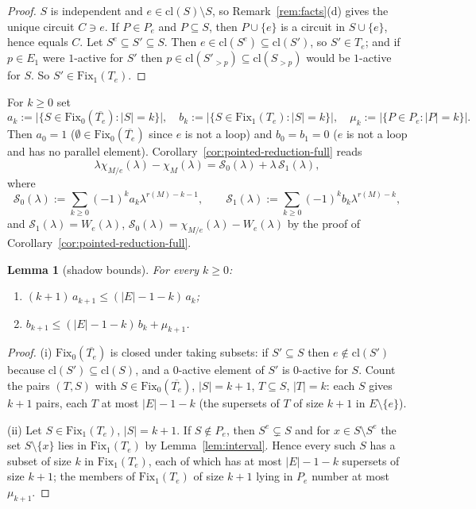 \documentclass[11pt,a4paper]{article}
\newtheorem{lemma}[theorem]{Lemma}
\theoremstyle{definition}
\newcommand{\Fix}{\mathrm{Fix}}
\newcommand{\cl}{\mathrm{cl}}
\begin{document}
\begin{proof}
$S$ is independent and $e\in\cl(S)\setminus S$, so Remark~\ref{rem:facts}(d) gives the unique circuit $C\ni e$. If $P\in P_e$ and $P\subseteq S$, then $P\cup\{e\}$ is a circuit in $S\cup\{e\}$, hence equals $C$. Let $S^e\subseteq S'\subseteq S$. Then $e\in\cl(S^e)\subseteq\cl(S')$, so $S'\in T_e$; and if $p\in E_1$ were $1$-active for $S'$ then $p\in\cl(S'_{>p})\subseteq\cl(S_{>p})$ would be $1$-active for $S$. So $S'\in\Fix_1(T_e)$.
\end{proof}

For $k\ge0$ set
\[
a_k:=\bigl|\{S\in\Fix_0(\overline{T_e}):|S|=k\}\bigr|,\quad
b_k:=\bigl|\{S\in\Fix_1(T_e):|S|=k\}\bigr|,\quad
\mu_k:=\bigl|\{P\in P_e:|P|=k\}\bigr| .
\]
Then $a_0=1$ ($\emptyset\in\Fix_0(\overline{T_e})$ since $e$ is not a loop) and $b_0=b_1=0$ ($e$ is not a loop and has no parallel element). Corollary~\ref{cor:pointed-reduction-full} reads
\begin{equation}\label{eq:ab}
\lambda\chi_{M/e}(\lambda)-\chi_M(\lambda)=\mathcal S_0(\lambda)+\lambda\,\mathcal S_1(\lambda),
\end{equation}
where
\[
\mathcal S_0(\lambda):=\sum_{k\ge0}(-1)^ka_k\lambda^{r(M)-k-1},\qquad
\mathcal S_1(\lambda):=\sum_{k\ge0}(-1)^kb_k\lambda^{r(M)-k},
\]
and $\mathcal S_1(\lambda)=W_e(\lambda)$, $\mathcal S_0(\lambda)=\chi_{M/e}(\lambda)-W_e(\lambda)$ by the proof of Corollary~\ref{cor:pointed-reduction-full}.

\begin{lemma}[shadow bounds]\label{lem:shadow}
For every $k\ge0$:
\begin{enumerate}[label=\textnormal{(\roman*)}]
\item $(k+1)\,a_{k+1}\le(|E|-1-k)\,a_k$;
\item $b_{k+1}\le(|E|-1-k)\,b_k+\mu_{k+1}$.
\end{enumerate}
\end{lemma}

\begin{proof}
(i) $\Fix_0(\overline{T_e})$ is closed under taking subsets: if $S'\subseteq S$ then $e\notin\cl(S')$ because $\cl(S')\subseteq\cl(S)$, and a $0$-active element of $S'$ is $0$-active for $S$. Count the pairs $(T,S)$ with $S\in\Fix_0(\overline{T_e})$, $|S|=k+1$, $T\subseteq S$, $|T|=k$: each $S$ gives $k+1$ pairs, each $T$ at most $|E|-1-k$ (the supersets of $T$ of size $k+1$ in $E\setminus\{e\}$).

(ii) Let $S\in\Fix_1(T_e)$, $|S|=k+1$. If $S\notin P_e$, then $S^e\subsetneq S$ and for $x\in S\setminus S^e$ the set $S\setminus\{x\}$ lies in $\Fix_1(T_e)$ by Lemma~\ref{lem:interval}. Hence every such $S$ has a subset of size $k$ in $\Fix_1(T_e)$, each of which has at most $|E|-1-k$ supersets of size $k+1$; the members of $\Fix_1(T_e)$ of size $k+1$ lying in $P_e$ number at most $\mu_{k+1}$.
\end{proof}
\end{document}
